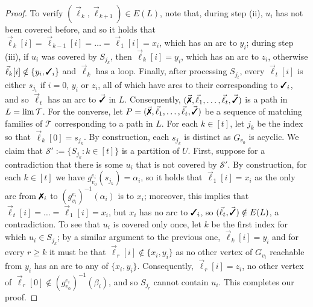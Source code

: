 \begin{proof}
  To verify $(\vec{\ell}_{k}, \vec{\ell}_{k+1}) \in E(L)$, note that, during step (ii),
  $u_i$ has not been covered before, and so it holds that $\vec{\ell}_{k}[i] =
  \vec{\ell}_{k-1}[i] = \dots = \vec{\ell}_{1}[i] = x_i$, which has an arc to $y_i$;
  during step (iii), if $u_i$ was covered by $S_{j_k}$, then $\vec{\ell}_{k}[i] = y_i$, which
  has an arc to $z_i$, otherwise $\vec{\ell}_{k}[i] \notin \{y_i, \mycmark_i\}$ and
  $\vec{\ell}_{k}$ has a loop.
  Finally, after processing $S_{j_t}$, every $\vec{\ell}_{t}[i]$ is
  either $s_{j_t}$ if $i = 0$, $y_i$ or $z_i$, all of which have arcs to their
  corresponding to $\mycmark_i$, and so $\vec{\ell}_{t}$ has an arc to $\vec{\mycmark}$
  in $L$. Consequently, $(\vec{\xmark}, \vec{\ell}_{1}, \dots, \vec{\ell}_{t},
  \vec{\mycmark})$ is a path in $L=\lim\operatorname{\mathcal{T}}$. For the converse, let $P = (\vec{\xmark}, \vec{\ell}_{1}, \dots, \vec{\ell}_{t},
  \vec{\mycmark})$ be a sequence of matching families of $\mathcal{T}$ corresponding to a
  path in $L$. For each $k\in [t]$, let $j_k$ be the index so that $\vec{\ell}_k[0]=s_{j_k}$. By construction, each $s_{j_k}$ is distinct as
  $G_{v_0}$ is acyclic. We claim that $\mathcal{S}' := \{S_{j_k} \colon k\in[t] \}$ is a partition of $U$.
  First, suppose for a contradiction that there is some $u_i$ that is not covered by $\mathcal{S}'$. By construction, for each $k\in[t]$ we have $g_{v_0}^{e_i}(s_{j_k}) = \alpha_i$, so it holds that
  $\vec{\ell}_{1}[i] = x_i$ as the only arc from $\xmark_i$ to
  $(g_{v_i}^{e_i})^{-1}(\alpha_i)$ is to $x_i$; moreover, this implies that
  $\vec{\ell}_{t}[i] = \dots = \vec{\ell}_{1}[i] = x_i$, but $x_i$ has no arc to $\mycmark_i$,
  so $(\vec{\ell}_{t}, \vec{\mycmark}) \notin E(L)$, a contradiction. To see that $u_i$ is covered only once, let $k$ be the first index for which $u_i \in
  S_{j_k}$; by a similar argument to the previous one, $\vec{\ell}_{k}[i] = y_i$ and for
  every $r \geq k$ it must be that $\vec{\ell}_{r}[i] \notin \{x_i, y_i\}$ as no other
  vertex of $G_{v_i}$ reachable from $y_i$ has an arc to any of $\{x_i, y_i\}$.
  Consequently, $\vec{\ell}_{r}[i] = z_i$, no other vertex of $\vec{\ell}_{r}[0] \notin
  (g_{v_0}^{e_i})^{-1}(\beta_i)$, and so $S_{j_r}$ cannot contain $u_i$. This completes our proof.
\end{proof}